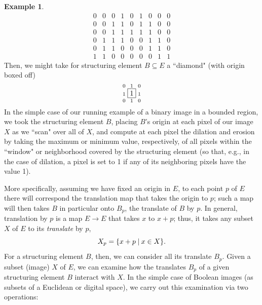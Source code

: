 \documentclass[a4paper]{book}
\theoremstyle{definition}
\newtheorem{example}{Example}[section]
\theoremstyle{definition}
\theoremstyle{definition}
\theoremstyle{theorem}
\theoremstyle{definition}
\begin{document}
\begin{example}
\begin{equation*}
\begin{smallmatrix}
	0 & 0 & 0 & 1 & 0 & 1 & 0 & 0 & 0\\ 
	0 & 0 & 1 & 1 & 0 & 1 & 1 & 0 & 0 \\
	0 & 0 & 1 & 1 & 1 & 1 & 1 & 0 & 0\\
	0 & 1 & 1 & 1 & 0 & 0 & 1 & 1 & 0\\ 
	0 & 1 & 1 & 0 & 0 & 0 & 1 & 1 & 0\\ 
	1 & 1 & 0 & 0 & 0 & 0 & 0 & 1 & 1 
	\end{smallmatrix}
	\end{equation*} 
	Then, we might take for structuring element $B \subseteq  E$ a ``diamond" (with origin boxed off)
	\begin{equation*} 
	\begin{smallmatrix}
	0 & 1 & 0 \\ 
	1 & \fbox{1} & 1 \\ 
	0 & 1 & 0
	\end{smallmatrix} 
	\end{equation*}
	In the simple case of our running example of a binary image in a bounded region, we took the structuring element $B$, placing $B$'s origin at each pixel of our image $X$ as we ``scan" over all of $X$, and compute at each pixel the dilation and erosion by taking the maximum or minimum value, respectively, of all pixels within the ``window" or neighborhood covered by the structuring element (so that, e.g., in the case of dilation, a pixel is set to 1 if any of its neighboring pixels have the value 1). \par  
	More specifically, assuming we have fixed an origin in $E$, to each point $p$ of $E$ there will correspond the translation map that takes the origin to $p$; such a map will then takes $B$ in particular onto $B_p$, the translate of $B$ by $p$. In general, translation by $p$ is a map $E \rightarrow E$ that takes $x$ to $x + p$; thus, it takes any subset $X$ of $E$ to its \textit{translate} by $p$, 
	\begin{equation*}
	X_p = \{x+p \hspace*{0.25em}| \hspace*{0.25em} x \in X \}. 
	\end{equation*} 
	For a structuring element $B$, then, we can consider all its translate $B_p$. Given a subset (image) $X$ of $E$, we can examine how the translates $B_p$ of a given structuring element $B$ interact with $X$. In the simple case of Boolean images (as subsets of a Euclidean or digital space), we carry out this examination via two operations: 
	\begin{equation}

\end{equation}
\end{example}
\end{document}
